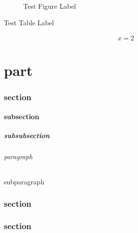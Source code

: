 
\begin{figure}
  \caption{Test Figure Label} \label{fig:figure}
\end{figure}

\begin{table}
   \label{tab:subtable}
  \caption{Test Table Label} \label{tab:table}
\end{table}

\begin{align}
  x = 2 \label{eq:equation}
\end{align}

\part{part} \label{sec:part}
\section{section} \label{sec:section}
\subsection{subsection} \label{sec:subsection}
\subsubsection{subsubsection} \label{sec:subsubsection}
\paragraph{paragraph} \label{sec:paragraph}
\subparagraph{subparagraph} \label{sec:subparagraph}
 \label{sec:minisec}


\section[Test]{section} \label{sec:sectionwithoption}
\section*{section} \label{sec:sectionwithstar}
